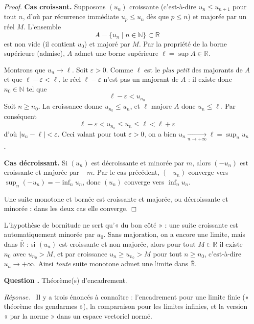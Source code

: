 \documentclass[11pt]{article}
\newcounter{qnum}
\newcommand{\question}[1]{%
\stepcounter{qnum}%
\bigskip
\noindent\textbf{Question \theqnum.} #1\par}
\newcommand{\reponse}{\noindent\textit{Réponse.}\ }
\begin{document}
\begin{proof}
\textbf{Cas croissant.} Supposons $(u_n)$ croissante (c'est-à-dire $u_n\leq u_{n+1}$ pour tout $n$, d'où par récurrence immédiate $u_p\leq u_n$ dès que $p\leq n$) et majorée par un réel $M$. L'ensemble
\[A = \{u_n \mid n\in\mathbb{N}\} \subset \mathbb{R}\]
est non vide (il contient $u_0$) et majoré par $M$. Par la propriété de la borne supérieure (admise), $A$ admet une borne supérieure $\ell=\sup A\in\mathbb{R}$.

Montrons que $u_n\to\ell$. Soit $\varepsilon>0$. Comme $\ell$ est le \emph{plus petit} des majorants de $A$ et que $\ell-\varepsilon<\ell$, le réel $\ell-\varepsilon$ n'est pas un majorant de $A$ : il existe donc $n_0\in\mathbb{N}$ tel que
\[\ell-\varepsilon < u_{n_0}\]
Soit $n\geq n_0$. La croissance donne $u_{n_0}\leq u_n$, et $\ell$ majore $A$ donc $u_n\leq\ell$. Par conséquent
\[\ell-\varepsilon < u_{n_0} \leq u_n \leq \ell < \ell+\varepsilon\]
d'où $|u_n-\ell|<\varepsilon$. Ceci valant pour tout $\varepsilon>0$, on a bien $u_n\xrightarrow[n\to+\infty]{}\ell=\sup_n u_n$.

\textbf{Cas décroissant.} Si $(u_n)$ est décroissante et minorée par $m$, alors $(-u_n)$ est croissante et majorée par $-m$. Par le cas précédent, $(-u_n)$ converge vers $\sup_n(-u_n)=-\inf_n u_n$, donc $(u_n)$ converge vers $\inf_n u_n$.

Une suite monotone et bornée est croissante et majorée, ou décroissante et minorée : dans les deux cas elle converge.
\end{proof}

\begin{remarque}
L'hypothèse de bornitude ne sert qu'« du bon côté » : une suite croissante est automatiquement minorée par $u_0$. Sans majoration, on a encore une limite, mais dans $\overline{\mathbb{R}}$ : si $(u_n)$ est croissante et non majorée, alors pour tout $M\in\mathbb{R}$ il existe $n_0$ avec $u_{n_0}>M$, et par croissance $u_n\geq u_{n_0}>M$ pour tout $n\geq n_0$, c'est-à-dire $u_n\to+\infty$. Ainsi \emph{toute} suite monotone admet une limite dans $\overline{\mathbb{R}}$.
\end{remarque}

\question{Théorème(s) d'encadrement.}
\reponse
Il y a trois énoncés à connaître : l'encadrement pour une limite finie (« théorème des gendarmes »), la comparaison pour les limites infinies, et la version « par la norme » dans un espace vectoriel normé.
\end{document}
